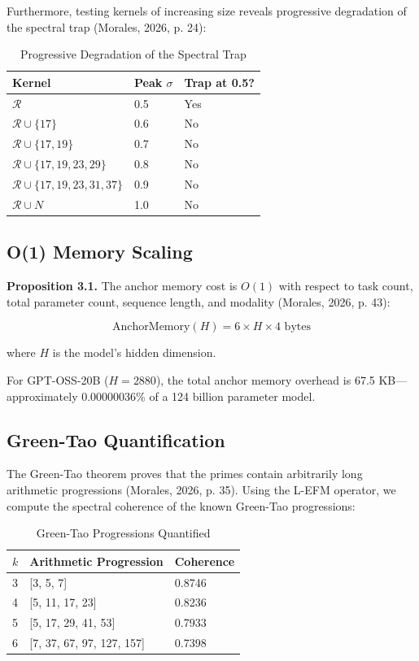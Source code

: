 \documentclass{article}
\begin{document}
Furthermore, testing kernels of increasing size reveals progressive degradation of the spectral trap (Morales, 2026, p. 24):

\begin{table}[ht]
\centering
\caption{Progressive Degradation of the Spectral Trap}
\begin{tabular}{lll}
\toprule
Kernel & Peak $\sigma$ & Trap at 0.5? \\
\midrule
$\mathcal{R}$ & 0.5 & Yes \\
$\mathcal{R} \cup \{17\}$ & 0.6 & No \\
$\mathcal{R} \cup \{17, 19\}$ & 0.7 & No \\
$\mathcal{R} \cup \{17, 19, 23, 29\}$ & 0.8 & No \\
$\mathcal{R} \cup \{17, 19, 23, 31, 37\}$ & 0.9 & No \\
$\mathcal{R} \cup N$ & 1.0 & No \\
\bottomrule
\end{tabular}
\end{table}

\subsection{O(1) Memory Scaling}

\textbf{Proposition 3.1.} The anchor memory cost is $O(1)$ with respect to task count, total parameter count, sequence length, and modality (Morales, 2026, p. 43):

\begin{equation}
\text{AnchorMemory}(H) = 6 \times H \times 4 \text{ bytes}
\end{equation}

where $H$ is the model's hidden dimension.

For GPT-OSS-20B ($H = 2880$), the total anchor memory overhead is 67.5 KB---approximately 0.00000036\% of a 124 billion parameter model.

\subsection{Green-Tao Quantification}

The Green-Tao theorem proves that the primes contain arbitrarily long arithmetic progressions (Morales, 2026, p. 35). Using the L-EFM operator, we compute the spectral coherence of the known Green-Tao progressions:

\begin{table}[ht]
\centering
\caption{Green-Tao Progressions Quantified}
\begin{tabular}{lll}
\toprule
$k$ & Arithmetic Progression & Coherence \\
\midrule
3 & [3, 5, 7] & 0.8746 \\
4 & [5, 11, 17, 23] & 0.8236 \\
5 & [5, 17, 29, 41, 53] & 0.7933 \\
6 & [7, 37, 67, 97, 127, 157] & 0.7398 \\
\bottomrule
\end{tabular}
\end{table}
\end{document}
